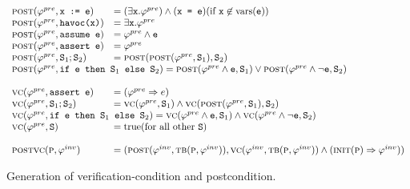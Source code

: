 
\begin{figure}
\[
\begin{array}{ll}
\postfn(\pre, \code{x := e}) &= (\exists \code{x}. \pre) \wedge (\code{x = e}) (\text{if } \code{x} \not\in \text{vars}(\code{e})) \\
\postfn(\pre, \code{havoc(x)}) &= \exists \code{x}. \pre \\
\postfn(\pre, \code{assume e}) &= \pre \wedge \code{e} \\
\postfn(\pre, \code{assert e}) &= \pre \\
\postfn(\pre, \stmtSA ; \stmtSB) &= \postfn( \postfn(\pre, \stmtSA), \stmtSB) \\
\multicolumn{2}{l}{\postfn(\pre, \code{if \expr{} then \stmtSA{} else \stmtSB{}}) = \postfn(\pre \wedge \expr, \stmtSA) \vee \postfn(\pre \wedge \neg \expr, \stmtSB)} \\
\\
\vcfn(\pre, \code{assert e}) &= (\pre \Rightarrow e) \\
\vcfn(\pre, \stmtSA ; \stmtSB) &= \vcfn(\pre, \stmtSA) \wedge \vcfn( \postfn(\pre, \stmtSA), \stmtSB) \\
\multicolumn{2}{l}{
\vcfn(\pre, \code{if \expr{} then \stmtSA{} else \stmtSB{}}) = \vcfn(\pre \wedge \expr, \stmtSA) \wedge \vcfn(\pre \wedge \neg \expr, \stmtSB)
} \\
\vcfn(\pre, \stmt) &= \text{true} (\text{for all other \stmt}) \\
\\
\mainvc{\procP}{\inv} &= (\postfn(\inv, \tbody(\proc,\inv)), \vcfn(\inv, \tbody(\proc,\inv)) \wedge (\initstatefn(\proc) \Rightarrow \inv))
\end{array}
\]
\caption{Generation of verification-condition and postcondition.}
\label{fig:vcgen}
\end{figure}

